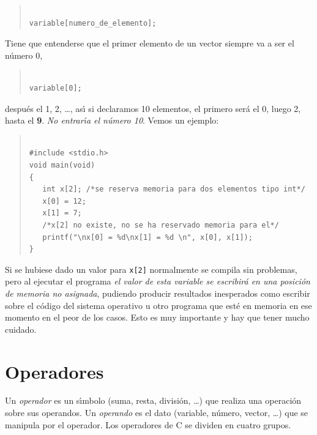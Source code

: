 \begin{quotation}
\begin{verbatim}

variable[numero_de_elemento];

\end{verbatim}
\end{quotation}

Tiene que entenderse que el primer elemento de un vector  siempre va a ser el
n\'umero 0,

\begin{quotation}
\begin{verbatim}

variable[0];

\end{verbatim}
\end{quotation}

despu\'es el 1, 2, \ldots, as\'{\i} si declaramos 10 elementos, el primero 
ser\'a el 0, luego 2, hasta el \textbf{9}. \emph{No entrar\'{\i}a el 
n\'umero 10}. Vemos un ejemplo:

\begin{quotation}
\begin{verbatim}

#include <stdio.h>
void main(void)
{
   int x[2]; /*se reserva memoria para dos elementos tipo int*/
   x[0] = 12;
   x[1] = 7;
   /*x[2] no existe, no se ha reservado memoria para el*/
   printf("\nx[0] = %d\nx[1] = %d \n", x[0], x[1]);
}

\end{verbatim}
\end{quotation}

Si se hubiese dado un valor para \texttt{x[2]} normalmente se compila sin 
problemas, pero al ejecutar el programa \emph{el valor de esta variable se 
escribir\'a en una posici\'on de memoria no asignada}, pudiendo producir 
resultados inesperados como escribir sobre el c\'odigo del sistema operativo
u otro programa que est\'e en memoria en ese momento en el peor de los casos.
Esto es muy importante y hay que tener mucho cuidado.

\section{Operadores}


Un \emph{operador} es un s\'{\i}mbolo (suma, resta, divisi\'on, \ldots) 
que realiza una operaci\'on sobre sus operandos. Un \emph{operando} es
el dato (variable, n\'umero, vector, \ldots) que se manipula por el
operador. Los operadores de C se dividen en cuatro grupos.

